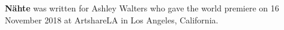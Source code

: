 \textbf{Nähte} was written for Ashley Walters who gave the world premiere on 16
November 2018 at ArtshareLA in Los Angeles, California.

